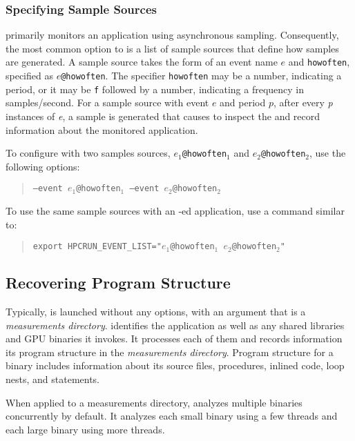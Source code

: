 \documentclass[11pt,twoside,letterpaper]{report}
\begin{document}
\subsubsection{Specifying Sample Sources}

\HPCToolkit{} primarily monitors an application using asynchronous sampling.
Consequently, the most common option to \hpcrun{} is a list of sample sources that define how samples are generated.
A sample source takes the form of an event name $e$ and \texttt{howoften}, specified as \texttt{$e$@howoften}. The specifier \texttt{howoften} may
be a number, indicating a period, \eg{}  or it may be \texttt{f} followed by a number,  indicating a frequency in samples/second.
For a sample source with event $e$ and period $p$, after every \emph{p} instances of \emph{e}, a sample is generated that causes \hpcrun{} to inspect the and record information about the monitored application.

To configure \hpcrun{} with two samples sources, \texttt{$e_1$@howoften$_1$} and \texttt{$e_2$@howoften$_2$}, use the following options:
\begin{quote}
  \texttt{--event $e_1$@howoften$_1$ --event $e_2$@howoften$_2$}
\end{quote}
To use the same sample sources with an \hpclink{}-ed application, use a command similar to:
\begin{quote}
  \texttt{export HPCRUN\_EVENT\_LIST="$e_1$@howoften$_1$ $e_2$@howoften$_2$"}
\end{quote}



\subsection{Recovering Program Structure}

Typically, \hpcstruct{} is launched without any options, with an argument that is a \HPCToolkit{}  \emph{measurements directory}.
\hpcstruct{} identifies the application as well as any shared libraries and GPU binaries it invokes.
It processes each of them and records information its program structure in the \emph{measurements directory}.
Program structure for a binary includes information about its source files, procedures, inlined code, loop nests, and statements.

When applied to a measurements directory, \hpcstruct{} analyzes multiple binaries concurrently by default.
It analyzes each small binary using a few threads and each large binary using more threads.
\end{document}
